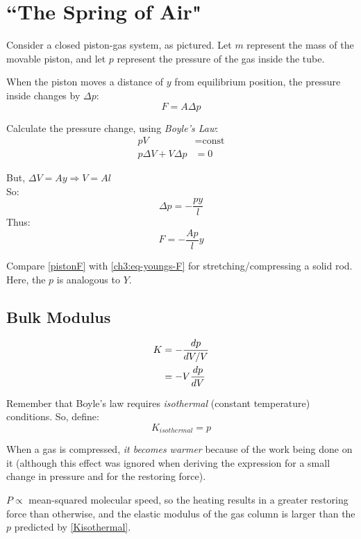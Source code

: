 \documentclass[11pt,letterpaper,titlepage,oneside]{book}
\begin{document}
\section{``The Spring of Air"} \label{ch3:sec-air}
Consider a closed piston-gas system, as pictured. Let $m$ represent the mass of the movable piston, and let $p$ represent the pressure of the gas inside the tube.

When the piston moves a distance of $y$ from equilibrium position, the pressure inside changes by $\Delta p$:
\[ F = A\Delta p \]

Calculate the pressure change, using \emph{Boyle's Law}:
\begin{align*}
pV &= \text{const} \\
p\Delta V + V\Delta p &= 0 \tag{a bit like the product rule for differentiation}
\end{align*}

But, $\Delta V = Ay \Longrightarrow V = Al$ \\
So: \[ \Delta p = -\frac{py}{l} \]
Thus: \begin{equation} \boxed{ F=-\frac{Ap}{l}y } \label{pistonF} \end{equation}

Compare \eqref{pistonF} with \eqref{ch3:eq-youngs-F} for stretching/compressing a solid rod. Here, the $p$ is analogous to $Y$.

\subsection{Bulk Modulus}
\begin{align}
K &= -\frac{dp}{dV/V} \notag \\
&= -V\frac{dp}{dV}
\end{align}

Remember that Boyle's law requires \emph{isothermal} (constant temperature) conditions. So, define: \begin{equation} K_{isothermal} = p \label{Kisothermal} \end{equation} 
 
When a gas is compressed, \textit{it becomes warmer} because of the work being done on it (although this effect was ignored when deriving the expression for a small change in pressure and for the restoring force).

$P \propto$ mean-squared molecular speed, so the heating results in a greater restoring force than otherwise, and the elastic modulus of the gas column is larger than the $p$ predicted by \eqref{Kisothermal}.
\end{document}
